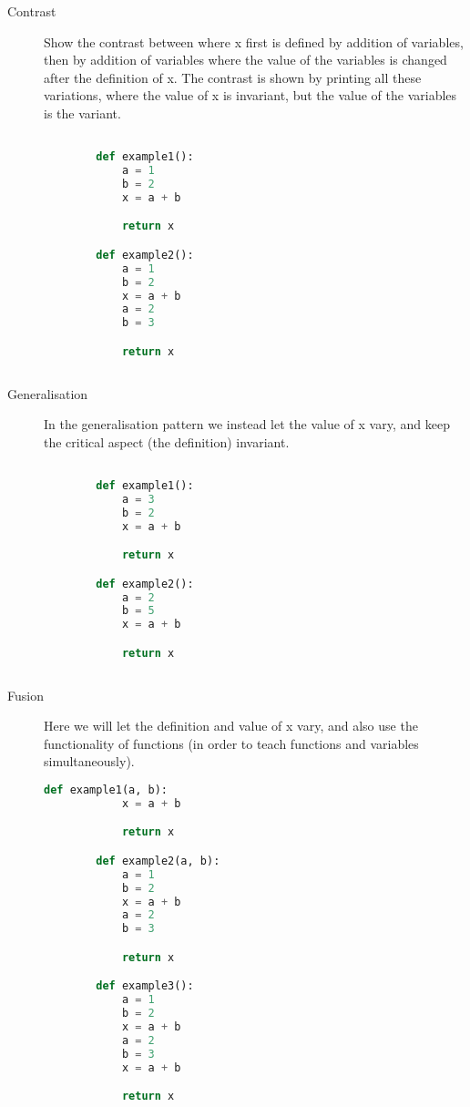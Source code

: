 \begin{description}
    \item [Contrast] Show the contrast between where x first is defined by 
addition of variables, then by addition of variables where the value of 
the variables is changed after the definition of x. The contrast is 
shown by printing all these variations, where the value of x is 
invariant, but the value of the variables is the variant. 
    \begin{lstlisting}[language=Python]

        def example1():
            a = 1
            b = 2
            x = a + b

            return x

        def example2():
            a = 1
            b = 2
            x = a + b
            a = 2
            b = 3

            return x
            
    \end{lstlisting}

    \item [Generalisation] In the generalisation pattern we instead let the 
value of x vary, and keep the critical aspect (the definition) 
invariant. 
    \begin{lstlisting}[language=Python]

        def example1():
            a = 3
            b = 2
            x = a + b

            return x

        def example2():
            a = 2
            b = 5
            x = a + b

            return x
            
    \end{lstlisting}

    \item [Fusion] Here we will let the definition and value of x vary, and 
also use the functionality of functions (in order to teach functions 
and variables simultaneously). 

    \begin{lstlisting}[language=Python]
        def example1(a, b):
            x = a + b

            return x

        def example2(a, b):
            a = 1
            b = 2
            x = a + b
            a = 2
            b = 3

            return x

        def example3():
            a = 1
            b = 2
            x = a + b
            a = 2
            b = 3
            x = a + b

            return x
            
    \end{lstlisting}
    
\end{description}



